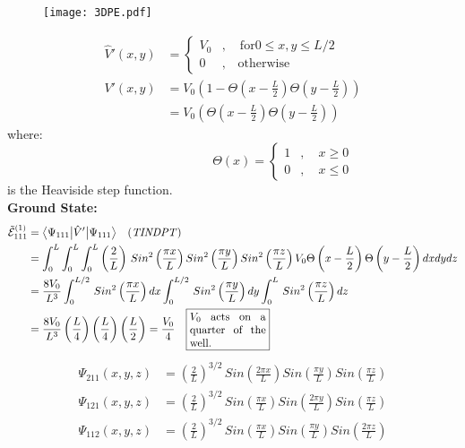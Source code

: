 \documentclass[12pt,fancychapters]{report}
\numberwithin{equation}{section}
\begin{document}
\begin{wrapfigure}[15]{l}{7cm}
  \begin{center}
\texttt{[image: 3DPE.pdf]}
  \end{center}
\end{wrapfigure}
\begin{align*}
  \hat{V}'(x,y)&=\begin{cases}
    V_0 &,\quad \text{for} 0\leq x,y \leq L/2\\
    0&, \quad \text{otherwise}
  \end{cases}\\
    V'(x,y) &= V_0\left(1-\Theta\left(x-\frac{L}{2}\right) \Theta\left(y-\frac{L}{2}\right)\right)\\
            &= V_0\left(\Theta\left(x-\frac{L}{2}\right) \Theta\left(y-\frac{L}{2}\right) \right)
\end{align*}
\qquad \qquad \qquad\qquad \qquad \qquad \qquad\qquad\qquad   where: 
\[
 \qquad\qquad\qquad\qquad \Theta(x) = 
  \begin{cases}
    1 &,\quad x\geq 0\\
    0 &,\quad x \leq 0
  \end{cases}
\]
\qquad \qquad \qquad\qquad \qquad \qquad \qquad\qquad\qquad is the Heaviside step function.\\
\textbf{Ground State:}
\begin{align*}
  \tilde{\mathcal{E}}_{111}^{(1)} &= \big<\Psi_{111}\big|\hat{V}'\big|\Psi_{111} \big>\quad
  \text{(\emph{TINDPT})}\\
&= \int_{0}^{L}\int_{0}^{L}\int_{0}^{L}\left(\frac{2}{L}\right)\,Sin^2\left(\frac{\pi x}{L}\right)
  Sin^2\left(\frac{ \pi y}{L}\right)Sin^2\left(\frac{ \pi z}{L}\right)
  V_0\Theta\left(x-\frac{L}{2}\right) \Theta\left(y-\frac{L}{2}\right)dxdydz\\
&= \frac{8V_0}{L^3}\int_{0}^{L/2}\,Sin^2\left(\frac{\pi x}{L}\right)dx
\int_{0}^{L/2}\,Sin^2\left(\frac{\pi y}{L}\right)dy
\int_{0}^{L}\,Sin^2\left(\frac{\pi z}{L}\right)dz\\
&= \frac{8V_0}{L^3}\left(\frac{L}{4}\right)\left(\frac{L}{4}\right)\left(\frac{L}{2}\right)
=\frac{V_0}{4}  \quad \fbox{%
  \parbox{.2\textwidth}{%
    $V_0$ acts on a quarter of the well.}%
  }
\end{align*}
\begin{align*}
  \Psi_{211}(x,y,z) &= \left(\frac{2}{L}\right)^{3/2}\,Sin\left(\frac{2\pi x}{L}\right)Sin\left(
  \frac{\pi y}{L}\right)Sin\left(\frac{\pi z}{L}\right)\\
\Psi_{121}(x,y,z) &= \left(\frac{2}{L}\right)^{3/2}\,Sin\left(\frac{\pi x}{L}\right)Sin\left(
  \frac{2\pi y}{L}\right)Sin\left(\frac{\pi z}{L}\right)\\
  \Psi_{112}(x,y,z) &= \left(\frac{2}{L}\right)^{3/2}\,Sin\left(\frac{\pi x}{L}\right)Sin\left(
  \frac{\pi y}{L}\right)Sin\left(\frac{2\pi z}{L}\right)
\end{align*}
\end{document}

